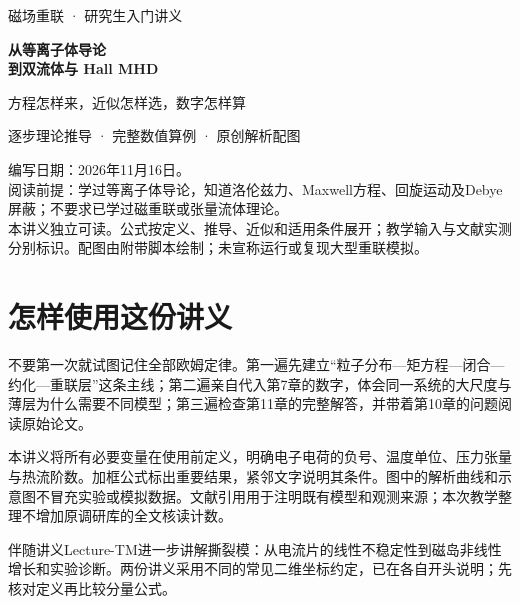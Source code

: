 \documentclass[UTF8,a4paper,11pt,openany,fontset=fandol]{ctexbook}
\begin{document}
\frontmatter
\begin{titlepage}
\vspace*{20mm}
{\sffamily\Large 磁场重联 · 研究生入门讲义\par}
\vspace{15mm}
{\sffamily\Huge\bfseries\color{ink}从等离子体导论\\[8pt]到双流体与 Hall MHD\par}
\vspace{14mm}
{\Large 方程怎样来，近似怎样选，数字怎样算\par}
\vspace{12mm}
{\large 逐步理论推导 · 完整数值算例 · 原创解析配图\par}
\vfill
编写日期：2026年11月16日。\\[8pt]
阅读前提：学过等离子体导论，知道洛伦兹力、Maxwell方程、回旋运动及Debye屏蔽；不要求已学过磁重联或张量流体理论。\\[8pt]
本讲义独立可读。公式按定义、推导、近似和适用条件展开；教学输入与文献实测分别标识。配图由附带脚本绘制；未宣称运行或复现大型重联模拟。
\end{titlepage}
\chapter*{怎样使用这份讲义}
不要第一次就试图记住全部欧姆定律。第一遍先建立“粒子分布—矩方程—闭合—约化—重联层”这条主线；第二遍亲自代入第7章的数字，体会同一系统的大尺度与薄层为什么需要不同模型；第三遍检查第11章的完整解答，并带着第10章的问题阅读原始论文。

本讲义将所有必要变量在使用前定义，明确电子电荷的负号、温度单位、压力张量与热流阶数。加框公式标出重要结果，紧邻文字说明其条件。图中的解析曲线和示意图不冒充实验或模拟数据。文献引用用于注明既有模型和观测来源；本次教学整理不增加原调研库的全文核读计数。

伴随讲义Lecture-TM进一步讲解撕裂模：从电流片的线性不稳定性到磁岛非线性增长和实验诊断。两份讲义采用不同的常见二维坐标约定，已在各自开头说明；先核对定义再比较分量公式。
\setcounter{tocdepth}{1}\tableofcontents\listoffigures
\mainmatter











\backmatter\begingroup\small\setlength{\bibsep}{3pt}\endgroup
\end{document}
